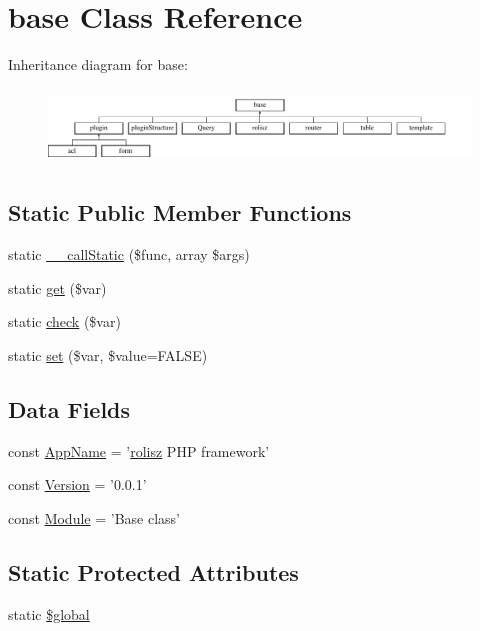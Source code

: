 \hypertarget{classbase}{
\section{base Class Reference}
\label{classbase}
}
Inheritance diagram for base:\begin{figure}[H]
\begin{center}
\leavevmode
\includegraphics[height=2.000000cm]{classbase}
\end{center}
\end{figure}
\subsection*{Static Public Member Functions}
\begin{DoxyCompactItemize}
\item 
static \hyperlink{classbase_a9fa8e32de2139fd5e55c102dcdf9120f}{\_\-\_\-callStatic} (\$func, array \$args)
\item 
static \hyperlink{classbase_a0e8f3e2708d9f0c6ee7b54599f57ea34}{get} (\$var)
\item 
static \hyperlink{classbase_ae09ec448121b7c739ecd283675056e1f}{check} (\$var)
\item 
static \hyperlink{classbase_adc76e59111cb34cf88726e6f3bd0be8b}{set} (\$var, \$value=FALSE)
\end{DoxyCompactItemize}
\subsection*{Data Fields}
\begin{DoxyCompactItemize}
\item 
const \hyperlink{classbase_aab75444b144ffc4e972a9170e0a76ec0}{AppName} = '\hyperlink{classrolisz}{rolisz} PHP framework'
\item 
const \hyperlink{classbase_a62e44de9100d83ee01f5b4875b49a02b}{Version} = '0.0.1'
\item 
const \hyperlink{classbase_a2c348358c1db4bb5136855f7f31e1157}{Module} = 'Base class'
\end{DoxyCompactItemize}
\subsection*{Static Protected Attributes}
\begin{DoxyCompactItemize}
\item 
static \hyperlink{classbase_aad844777d9d6beb4ca7c92d97afe7d27}{\$global}
\end{DoxyCompactItemize}
